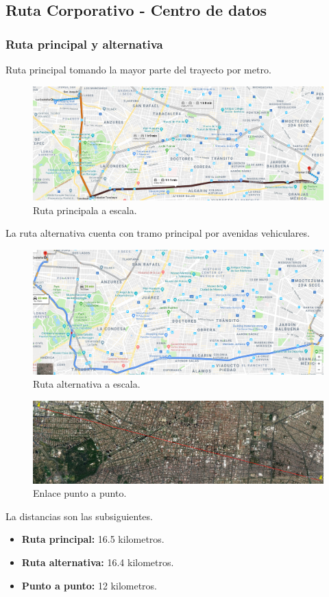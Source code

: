 \documentclass[12pt,letterpaper]{article}
\begin{document}
\newpage
\subsection{Ruta Corporativo - Centro de datos }
\subsubsection{Ruta principal y alternativa}
Ruta principal tomando la mayor parte del trayecto por metro.
\begin{figure}[ht]
    \centering
    \includegraphics[width=.9\textwidth]{imagenes/f2.png}
    \caption{Ruta principala a escala.}
\end{figure}

La ruta alternativa cuenta con tramo principal por avenidas 
vehiculares.
\begin{figure}[ht]
    \centering
    \includegraphics[width=.9\textwidth]{imagenes/f3.png}
    \caption{Ruta alternativa a escala.}
\end{figure}

\newpage
\begin{figure}[ht]
    \centering
    \includegraphics[width=.9\textwidth, angle=90]{imagenes/puntopunto.png}
    \caption{Enlace punto a punto.}
\end{figure}
La distancias son las subsiguientes.
\begin{itemize}
    \item \textbf{Ruta principal: } 16.5 kilometros.
    \item \textbf{Ruta alternativa: } 16.4 kilometros.
    \item \textbf{Punto a punto: } 12 kilometros.
\end{itemize}
\end{document}
